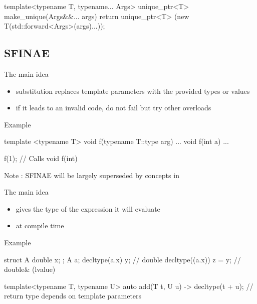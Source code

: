 \begin{frame}[fragile]
  \begin{cppcode*}{}
    template<typename T, typename... Args>
    unique_ptr<T> make_unique(Args&&... args) {
      return unique_ptr<T>
        (new T(std::forward<Args>(args)...));
    }
  \end{cppcode*}  
\end{frame}

\subsection[sfinae]{SFINAE}

\begin{frame}[fragile]
  \begin{block}{The main idea}
    \begin{itemize}
    \item substitution replaces template parameters with the provided types or values
    \item if it leads to an invalid code, do not fail but try other overloads
    \end{itemize}
  \end{block}
  \begin{exampleblock}{Example}
    \begin{cppcode*}{}
      template <typename T>
      void f(typename T::type arg) { ... }
      void f(int a) { ... }

      f(1); // Calls void f(int)
    \end{cppcode*}
  \end{exampleblock}
  Note : SFINAE will be largely superseded by concepts in 
\end{frame}

\begin{frame}[fragile]
  \begin{block}{The main idea}
    \begin{itemize}
    \item gives the type of the expression it will evaluate
    \item at compile time
    \end{itemize}
  \end{block}
  \begin{exampleblock}{Example}
    \begin{cppcode*}{}
      struct A { double x; };
      A a;
      decltype(a.x) y;       // double
      decltype((a.x)) z = y; // double& (lvalue)
 
      template<typename T, typename U>
      auto add(T t, U u) -> decltype(t + u);
      // return type depends on template parameters
    \end{cppcode*}
  \end{exampleblock}  
\end{frame}

